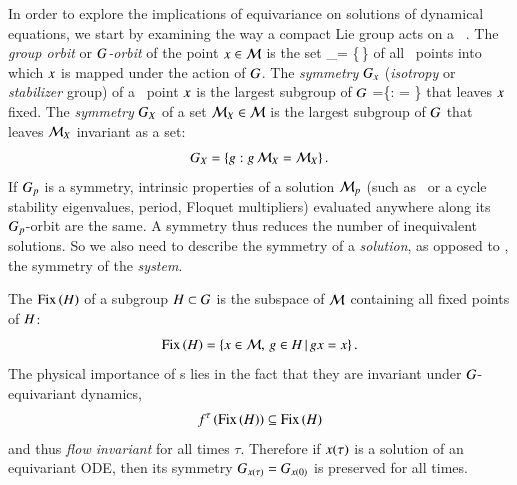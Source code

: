 \documentclass[preprint,number,sort&compress]{elsarticle}
\begin{document}
In order to explore the implications of equivariance on
solutions of dynamical equations,  we start by examining the
way a compact Lie group acts on a \statesp\ \pS. The
\emph{group orbit} or \emph{$G$-orbit} of the point
$x \in {\cal M}$ is the set
\beq
    \pS_\ssp = \{\LieEl\,\ssp \mid \LieEl \in {\Group}\}
of all \statesp\ points into which $\ssp$ is mapped under the
action of $\Group$.
The \emph{symmetry} $\stab{\ssp}$ (\emph{isotropy} or
\emph{stabilizer} group) of a \statesp\ point $\ssp$ is the
largest subgroup of $\Group$
\beq
\stab{\ssp} =\{\LieEl \in \Group: \LieEl \ssp = \ssp \}
that leaves $\ssp$ fixed.
The \emph{symmetry} $\stab{X}$ of a set $\pS_X \in \pS$ is
the largest subgroup  of $\Group$ that leaves $\pS_X$
in\-vari\-ant as a set:
\[
	\stab{X}= \{\LieEl: \LieEl \, \pS_X = \pS_X\}
\,.
\]
If $G_{p}$ is a symmetry, intrinsic properties of a
solution ${\cal M}_p$ (such as \eqv\ or a cycle stability
eigenvalues, period, Floquet multipliers) evaluated anywhere
along its $G_{p}$-orbit are the same. A symmetry thus
reduces the number of inequivalent solutions. So we also need
to describe the symmetry of a \emph{solution}, as opposed to
, the symmetry of the \emph{system}.

The \emph{\fixedsp} $\mathrm{Fix}\left(H\right)$ of a subgroup
$H\subset G$ is the subspace of ${\cal M}$ containing
all fixed points of $H$:
\[
	\mathrm{Fix}\left(H\right)=
      \{x\in{\cal M},\,g\in H \,|\,
        g x = x \}
\,.
\]
The physical importance of \fixedsp s lies in the fact that
they are in\-vari\-ant under $G$-equi\-vari\-ant
dynamics,
\[
 f^\tau\left(\mathrm{Fix}\left(H\right)\right)\subseteq \mathrm{Fix}\left(H\right)
\]
and thus \emph{flow in\-vari\-ant} for all times $\tau$.
Therefore if $x(\tau)$ is a solution of an equi\-vari\-ant ODE,
then its symmetry $G_{x(\tau)}=G_{x(0)}$ is
preserved for all times.
\end{document}
